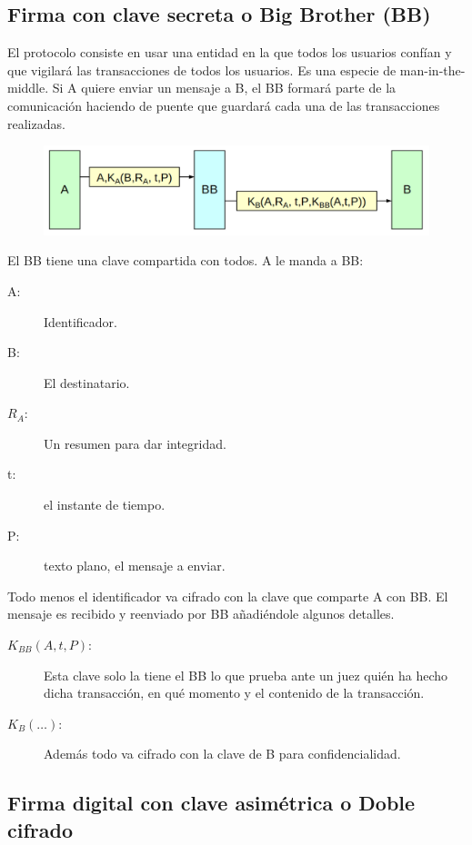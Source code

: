 \subsection{Firma con clave secreta o Big Brother (BB)}

El protocolo consiste en usar una entidad en la que todos los usuarios confían y que vigilará las transacciones de todos los usuarios. Es una especie de man-in-the-middle. Si A quiere enviar un mensaje a B, el BB formará parte de la comunicación haciendo de puente que guardará cada una de las transacciones realizadas. 

\begin{figure}[H]
    \centering
    \includegraphics[width=0.8\linewidth]{./images/big-brother.png}
    \label{fig:big-brother}
\end{figure}

El BB tiene una clave compartida con todos. A le manda a BB:
\begin{description}
    \item [A:]Identificador.
    \item [B:] El destinatario.
    \item [$R_A$:] Un resumen para dar integridad.
    \item [t:] el instante de tiempo.
    \item [P:] texto plano, el mensaje a enviar. 
\end{description}
Todo menos el identificador va cifrado con la clave que comparte A con BB. El mensaje es recibido y reenviado por BB añadiéndole algunos detalles.
\begin{description}
    \item [$K_{BB}(A,t,P)$:] Esta clave solo la tiene el BB lo que prueba ante un juez quién ha hecho dicha transacción, en qué momento y el contenido de la transacción.  
    \item [$K_B(\ldots)$:] Además todo va cifrado con la clave de B para confidencialidad. 
\end{description}


\subsection{Firma digital con clave asimétrica o Doble cifrado}

